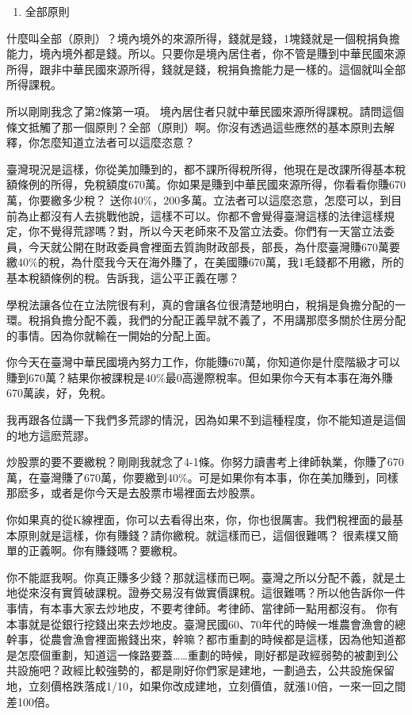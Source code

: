 \documentclass[]{ctexbook}
\providecommand{\tightlist}{%
  \setlength{\itemsep}{0pt}\setlength{\parskip}{0pt}}
\begin{document}
\begin{enumerate}
\def\labelenumi{\arabic{enumi}.}
\setcounter{enumi}{1}
\tightlist
\item
  全部原則
\end{enumerate}

什麼叫全部（原則）？境內境外的來源所得，錢就是錢，1塊錢就是一個稅捐負擔能力，境內境外都是錢。所以。只要你是境內居住者，你不管是賺到中華民國來源所得，跟非中華民國來源所得，錢就是錢，稅捐負擔能力是一樣的。這個就叫全部所得課稅。

所以剛剛我念了第2條第一項。
境內居住者只就中華民國來源所得課稅。請問這個條文抵觸了那一個原則？全部（原則）啊。你沒有透過這些應然的基本原則去解釋，你怎麼知道立法者可以這麼恣意？

臺灣現況是這樣，你從美加賺到的，都不課所得稅所得，他現在是改課所得基本稅額條例的所得，免稅額度670萬。你如果是賺到中華民國來源所得，你看看你賺670萬，你要繳多少稅？ 送你40\%，200多萬。立法者可以這麼恣意，怎麼可以，到目前為止都沒有人去挑戰他說，這樣不可以。你都不會覺得臺灣這樣的法律這樣規定，你不覺得荒謬嗎？對，所以今天老師來不及當立法委。你們有一天當立法委員，今天就公開在財政委員會裡面去質詢財政部長，部長，為什麼臺灣賺670萬要繳40\%的稅，為什麼我今天在海外賺了，在美國賺670萬，我1毛錢都不用繳，所的基本稅額條例的稅。告訴我，這公平正義在哪？

學稅法讓各位在立法院很有利，真的會讓各位很清楚地明白，稅捐是負擔分配的一環。稅捐負擔分配不義，我們的分配正義早就不義了，不用講那麼多關於住房分配的事情。因為你就輸在一開始的分配上面。

你今天在臺灣中華民國境內努力工作，你能賺670萬，你知道你是什麼階級才可以賺到670萬？結果你被課稅是40\%最0高邊際稅率。但如果你今天有本事在海外賺670萬誒，好，免稅。

我再跟各位講一下我們多荒謬的情況，因為如果不到這種程度，你不能知道是這個的地方這麽荒謬。

炒股票的要不要繳稅？剛剛我就念了4-1條。你努力讀書考上律師執業，你賺了670萬，在臺灣賺了670萬，你要繳到40\%。可是如果你有本事，你在美加賺到，同樣那麽多，或者是你今天是去股票市場裡面去炒股票。

你如果真的從K線裡面，你可以去看得出來，你，你也很厲害。我們稅裡面的最基本原則就是這樣，你有賺錢？請你繳稅。就這樣而已，這個很難嗎？ 很素樸又簡單的正義啊。你有賺錢嗎？要繳稅。

你不能誆我啊。你真正賺多少錢？那就這樣而已啊。臺灣之所以分配不義，就是土地從來沒有實質破課稅。證券交易沒有做實價課稅。這很難嗎？所以他告訴你一件事情，有本事大家去炒地皮，不要考律師。考律師、當律師一點用都沒有。
你有本事就是從銀行挖錢出來去炒地皮。臺灣民國60、70年代的時候一堆農會漁會的總幹事，從農會漁會裡面搬錢出來，幹嘛？都市重劃的時候都是這樣，因為他知道都是怎麼個重劃，知道這一條路要蓋\ldots\ldots 重劃的時候，剛好都是政經弱勢的被劃到公共設施吧？政經比較強勢的，都是剛好你們家是建地，一劃過去，公共設施保留地，立刻價格跌落成1/10，如果你改成建地，立刻價值，就漲10倍，一來一回之間差100倍。
\end{document}
